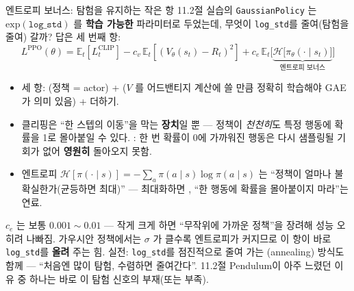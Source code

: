 \begin{frame}{엔트로피 보너스: 탐험을 유지하는 작은 항}
  \small
  11.2절 실습의 \texttt{GaussianPolicy} 는
  $\mathrm{exp}(\texttt{log\_std})$ 를 \textbf{학습 가능한}
  파라미터로 두었는데, 무엇이 \texttt{log\_std}를 줄여(탐험을
  줄여) 갈까? 답은 세 번째 항:
  \[
  L^{\mathrm{PPO}}(\theta) = \mathbb{E}_t[L^{\mathrm{CLIP}}_t]
  - c_v\,\mathbb{E}_t[(V_\theta(s_t)-R_t)^2]
  + c_e\,\mathbb{E}_t\Big[\underbrace{
  \mathcal{H}\big[\pi_\theta(\cdot\mid s_t)\big]}_{\text{엔트로피
  보너스}}\Big]
  \]
  \begin{itemize}
    \item 세 항: (정책 = actor) +
      ($V$ 를 어드밴티지 계산에 쓸 만큼
      정확히 학습해야 GAE가 의미 있음) + 
      더하기.
    \item 클리핑은 ``한 스텝의 이동''을 막는 \textbf{장치}일 뿐 —
      정책이 \textit{천천히}도 특정 행동에 확률을 1로 몰아붙일
      수 있다. : 한 번
      확률이 0에 가까워진 행동은 다시 샘플링될 기회가 없어
      \textbf{영원히} 돌아오지 못함.
    \item 엔트로피 $\mathcal{H}[\pi(\cdot\mid s)]
      = -\sum_a \pi(a\mid s)\log\pi(a\mid s)$ 는 ``정책이
      얼마나 불확실한가(균등하면 최대)'' — 최대화하면
      ,
      ``한 행동에 확률을 몰아붙이지 마라''는 연료.
  \end{itemize}
  \begin{block}{$c_e$ 는 보통 $0.001\sim0.01$ — 작게}
    크게 하면 ``무작위에 가까운 정책''을 장려해 성능 오히려
    나빠짐. 가우시안 정책에서는 $\sigma$ 가 클수록 엔트로피가
    커지므로 이 항이 바로 \texttt{log\_std}를 \textbf{올려}
    주는 힘. 실전: \texttt{log\_std}를 점진적으로 줄여 가는
    (annealing) 방식도 함께 — ``처음엔 많이 탐험, 수렴하면
    줄여간다''. 11.2절 Pendulum이 아주 느렸던 이유 중 하나는
    바로 이 탐험 신호의 부재(또는 부족).
  \end{block}
\end{frame}
